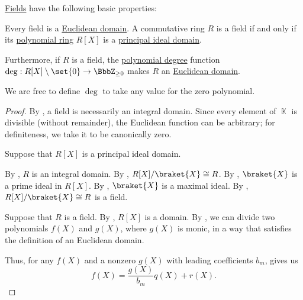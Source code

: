 \begin{proposition}\label{thm:def:field/properties}
  \hyperref[def:field]{Fields} have the following basic properties:
  \begin{thmenum}
     Every field is a \hyperref[def:euclidean_domain]{Euclidean domain}.
     A commutative ring \( R \) is a field if and only if its \hyperref[def:polynomial_semiring]{polynomial ring} \( R[X] \) is a \hyperref[def:principal_ideal_domain]{principal ideal domain}.

    Furthermore, if \( R \) is a field, the \hyperref[def:polynomial_degree]{polynomial degree} function \( \deg: R[X] \setminus \set{ 0 } \to \BbbZ_{\geq 0} \) makes \( R \) an \hyperref[def:euclidean_domain]{Euclidean domain}.

    We are free to define \( \deg \) to take any value for the zero polynomial.
  \end{thmenum}
\end{proposition}
\begin{proof}
   By , a field is necessarily an integral domain. Since every element of \( \BbbK \) is divisible (without remainder), the Euclidean function can be arbitrary; for definiteness, we take it to be canonically zero.

  \SufficiencySubProof* Suppose that \( R[X] \) is a principal ideal domain.

  By , \( R \) is an integral domain. By , \( R[X] / \braket{ X } \cong R \). By , \( \braket{ X } \) is a prime ideal in \( R[X] \). By , \( \braket{ X } \) is a maximal ideal. By , \( R[X] / \braket{ X } \cong R \) is a field.

  \NecessitySubProof* Suppose that \( R \) is a field. By , \( R[X] \) is a domain. By , we can divide two polynomials \( f(X) \) and \( g(X) \), where \( g(X) \) is monic, in a way that satisfies the definition of an Euclidean domain.

  Thus, for any \( f(X) \) and a nonzero \( g(X) \) with leading coefficients \( b_m \),  gives us
  \begin{equation*}
    f(X) = \frac {g(X)} {b_m} q(X) + r(X).
  \end{equation*}
\end{proof}

